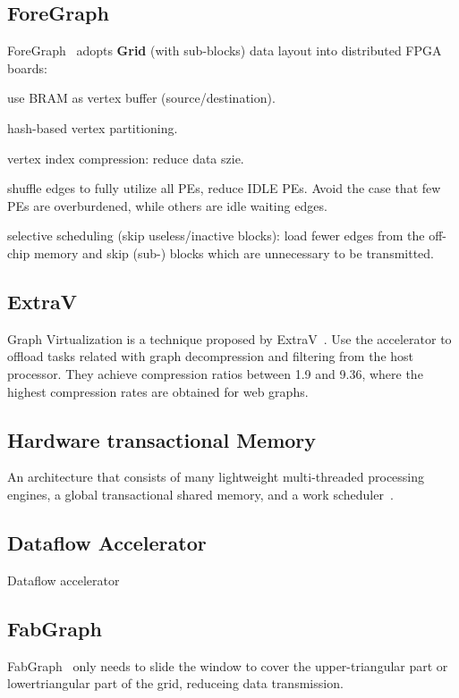 \documentclass[UTF8,12pt,a4paper]{article}
\begin{document}
\subsection{ForeGraph}
ForeGraph~\cite{DBLP:conf/fpga/DaiHCXWY17}
adopts \textbf{Grid} (with sub-blocks)
data layout into distributed FPGA boards:
\begin{compactitem}
  \item use BRAM as vertex buffer (source/destination).
  \item hash-based vertex partitioning.
  \item vertex index compression: reduce data szie.
  \item shuffle edges to fully utilize all PEs, reduce IDLE PEs.
  Avoid the case that few PEs are overburdened,
  while others are idle waiting edges.
  \item selective scheduling (skip useless/inactive blocks):
  load fewer edges from the off-chip memory and
  skip (sub-) blocks which are unnecessary to be transmitted.
\end{compactitem}

\subsection{ExtraV}
Graph Virtualization is a technique proposed by ExtraV~\cite{DBLP:journals/pvldb/LeeKYCHNNJ17}.
Use the accelerator to offload tasks related with
graph decompression and filtering from the host processor.
They achieve compression ratios between 1.9 and 9.36,
where the highest compression rates are obtained for web graphs.

\subsection{Hardware transactional Memory}
An architecture that consists of many lightweight multi-threaded processing engines,
a global transactional shared memory, and a work scheduler~\cite{DBLP:conf/fpga/MaZC17}.

\subsection{Dataflow Accelerator}
Dataflow accelerator~\cite{DBLP:conf/icdcs/JinYLZL17}~\cite{DBLP:conf/IEEEpact/Yao0L0H18}

\subsection{FabGraph}
FabGraph~\cite{DBLP:conf/fpga/ShaoLHL019}
only needs to slide the window
to cover the upper-triangular part or lowertriangular part of the grid,
reduceing data transmission.
\end{document}
